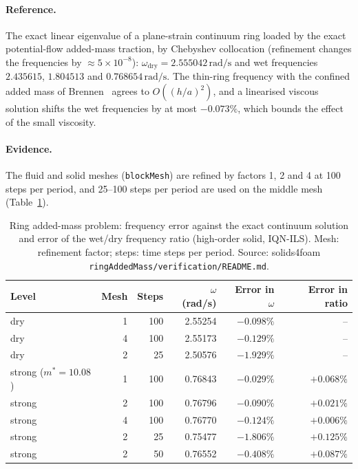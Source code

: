\paragraph{Reference.}
The exact linear eigenvalue of a plane-strain continuum ring loaded by the exact potential-flow added-mass traction, by Chebyshev collocation (refinement changes the frequencies by $\approx5\times10^{-8}$): $\omega_\mathrm{dry} = 2.555042\,\mathrm{rad/s}$ and wet frequencies $2.435615$, $1.804513$ and $0.768654\,\mathrm{rad/s}$.
The thin-ring frequency with the confined added mass of Brennen~\citep{Brennen1982} agrees to $O((h/a)^2)$, and a linearised viscous solution shifts the wet frequencies by at most $-0.073\%$, which bounds the effect of the small viscosity.

\paragraph{Evidence.}
The fluid and solid meshes (\texttt{blockMesh}) are refined by factors 1, 2 and 4 at 100 steps per period, and 25--100 steps per period are used on the middle mesh (Table~\ref{tab:ring}).

\begin{table}[htbp]
	\centering
	\small
	\setlength{\tabcolsep}{5pt}
	\caption{Ring added-mass problem: frequency error against the exact continuum solution and error of the wet/dry frequency ratio (high-order solid, IQN-ILS). Mesh: refinement factor; steps: time steps per period. Source: solids4foam \texttt{ringAddedMass/verification/README.md}.}
	\label{tab:ring}
	\begin{tabular}{lrrrrr}
		\toprule
		Level & Mesh & Steps & $\omega$ (rad/s) & Error in $\omega$ & Error in ratio \\
		\midrule
		dry & 1 & 100 & 2.55254 & $-0.098\%$ & -- \\
		dry & 4 & 100 & 2.55173 & $-0.129\%$ & -- \\
		dry & 2 & 25 & 2.50576 & $-1.929\%$ & -- \\
		strong ($m^*=10.08$) & 1 & 100 & 0.76843 & $-0.029\%$ & $+0.068\%$ \\
		strong & 2 & 100 & 0.76796 & $-0.090\%$ & $+0.021\%$ \\
		strong & 4 & 100 & 0.76770 & $-0.124\%$ & $+0.006\%$ \\
		strong & 2 & 25 & 0.75477 & $-1.806\%$ & $+0.125\%$ \\
		strong & 2 & 50 & 0.76552 & $-0.408\%$ & $+0.087\%$ \\
		\bottomrule
	\end{tabular}
\end{table}

